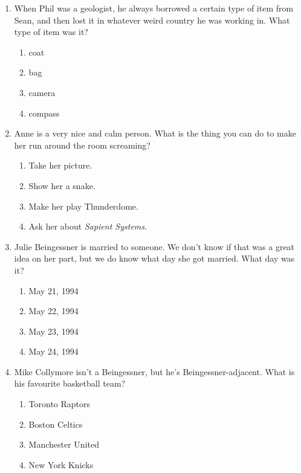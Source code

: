 \documentclass[11pt]{exam}
\begin{document}
\begin{questions}
\begin{enumerate}
\item When Phil was a geologist, he always borrowed a certain type of item from Sean, and then lost it in whatever weird country he was working in. What type of item was it?

\begin{enumerate}
\item{} coat
\item{} bag
\item{} camera
\item{} compass
\end{enumerate}



\item Anne is a very nice and calm person. What is the thing you can do to make her run around the room screaming?

\begin{enumerate}
\item{} Take her picture.
\item{} Show her a snake.
\item{} Make her play Thunderdome.
\item{} Ask her about \emph{Sapient Systems}.
\end{enumerate}



\item Julie Beingessner is married to someone. We don’t know if that was a great idea on her part, but we do know what day she got married. What day was it?

\begin{enumerate}
\item{} May 21, 1994
\item{} May 22, 1994
\item{} May 23, 1994
\item{} May 24, 1994
\end{enumerate}



\item Mike Collymore isn’t a Beingessner, but he’s Beingessner-adjacent. What is his favourite basketball team?

\begin{enumerate}
\item{} Toronto Raptors
\item{} Boston Celtics
\item{} Manchester United
\item{} New York Knicks
\end{enumerate}


\end{enumerate}
\end{questions}
\end{document}
